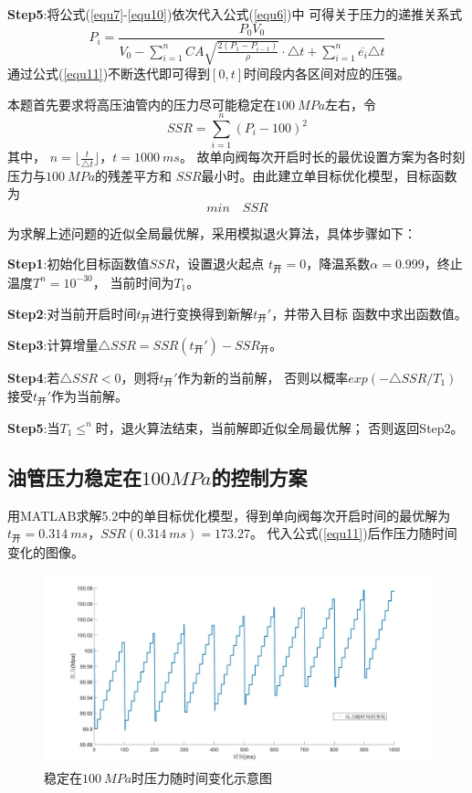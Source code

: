 \documentclass[withoutpreface,bwprint]{cumcmthesis} %
\begin{document}
    \textbf{Step5}:将公式(\ref{equ7}-\ref{equ10})依次代入公式(\ref{equ6})中
    可得关于压力的递推关系式
    \begin{equation}
        P_i=\frac{P_0V_0}
        {V_0-\sum\limits_{i=1}^n CA\sqrt{\frac{2(P_1-P_{i-1})}{\rho}}\cdot\triangle t +\sum\limits_{i=1}^n \overline{e_i}\triangle t}
    \label{equ11}
    \end{equation}
    通过公式(\ref{equ11})不断迭代即可得到$[0,t]$时间段内各区间对应的压强。

    本题首先要求将高压油管内的压力尽可能稳定在$100~MPa$左右，令
    \begin{equation}
        SSR=\sum\limits_{i=1}^n (P_i-100)^2
    \label{equ12}
    \end{equation}
    其中，
    $n=\lfloor{\frac{t}{\triangle t}}\rfloor$，$t=1000~ms$。
    故单向阀每次开启时长的最优设置方案为各时刻压力与$100~MPa$的残差平方和
    $SSR$最小时。由此建立单目标优化模型，目标函数为
    \begin{equation}
       min \quad SSR
    \label{equ13}
    \end{equation}

    为求解上述问题的近似全局最优解，采用模拟退火算法，具体步骤如下：

    \textbf{Step1}:初始化目标函数值$SSR$，设置退火起点
    $t_{\text{开}}=0$，降温系数$\alpha=0.999$，终止温度$T^n=10^{-30}$，
    当前时间为$T_1$。

    \textbf{Step2}:对当前开启时间$t_{\text{开}}$进行变换得到新解$t_{\text{开}}'$，并带入目标
    函数中求出函数值。

    \textbf{Step3}:计算增量$\triangle SSR=SSR(t_{\text{开}}')-SSR_{\text{开}}$。
    
    \textbf{Step4}:若$\triangle SSR<0$，则将$t_{\text{开}}'$作为新的当前解，
    否则以概率$exp(-\triangle SSR/T_1)$接受$t_{\text{开}}'$作为当前解。

    \textbf{Step5}:当$T_1 \leq ^n$时，退火算法结束，当前解即近似全局最优解；
    否则返回Step2。

\subsection{油管压力稳定在$100MPa$的控制方案}
    用MATLAB求解5.2中的单目标优化模型，得到单向阀每次开启时间的最优解为
    $t_{\text{开}}=0.314~ms$，$SSR(0.314~ms)=173.27$。
    代入公式(\ref{equ11})后作压力随时间变化的图像。 
    \begin{figure}[!h]
    \centering
    \includegraphics[width=.95\textwidth]{100Mpa.jpg}
    \caption{稳定在$100~MPa$时压力随时间变化示意图}
    \label{figure3}
    \end{figure}
\end{document}
